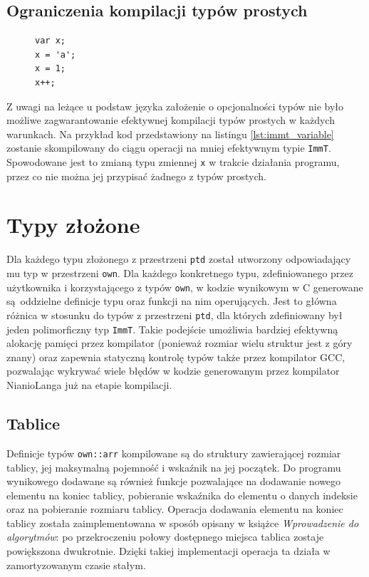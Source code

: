 \documentclass[licencjacka]{pracamgr}
\begin{document}
\subsection{Ograniczenia kompilacji typów prostych}
\begin{figure}
\begin{lstlisting}[caption={Zmienna kompilowana do typu \texttt{ImmT}},label={lst:immt_variable},aboveskip=-15pt,language=nl]
var x;
x = 'a';
x = 1;
x++;
\end{lstlisting}
\end{figure}
Z uwagi na leżące u podstaw języka założenie o opcjonalności typów nie było możliwe
zagwarantowanie efektywnej kompilacji typów prostych w każdych warunkach.
Na przykład kod przedstawiony na listingu \ref{lst:immt_variable} zostanie skompilowany do ciągu operacji na mniej efektywnym typie
\texttt{ImmT}. Spowodowane jest to zmianą typu zmiennej \texttt{x} w trakcie działania programu,
przez co nie można jej przypisać żadnego z typów prostych.

\section{Typy złożone}
Dla każdego typu złożonego z przestrzeni \texttt{ptd} został utworzony odpowiadający mu typ
w przestrzeni \texttt{own}. Dla każdego konkretnego typu, zdefiniowanego przez użytkownika
i korzystającego z typów \texttt{own}, w kodzie wynikowym w C generowane są oddzielne definicje
typu oraz funkcji na nim operujących. Jest to główna różnica w stosunku do typów z przestrzeni
\texttt{ptd}, dla których zdefiniowany był jeden polimorficzny typ \texttt{ImmT}.
Takie podejście umożliwia bardziej efektywną alokację pamięci przez kompilator (ponieważ rozmiar
wielu struktur jest z góry znany) oraz zapewnia statyczną kontrolę typów także przez kompilator
GCC, pozwalając wykrywać wiele błędów w kodzie generowanym przez kompilator
NianioLanga już na etapie kompilacji.
\subsection{Tablice}
Definicje typów \texttt{own::arr} kompilowane są do struktury zawierającej rozmiar tablicy, jej
maksymalną pojemność i wskaźnik na jej początek. Do programu wynikowego
dodawane są również funkcje pozwalające na dodawanie nowego elementu na koniec tablicy, pobieranie wskaźnika do elementu
o danych indeksie oraz na pobieranie rozmiaru tablicy. Operacja dodawania elementu na koniec tablicy
została zaimplementowana w sposób opisany w książce
\textit{Wprowadzenie do algorytmów}\cite{cormen}: po przekroczeniu połowy dostępnego miejsca
tablica zostaje powiększona dwukrotnie. Dzięki takiej implementacji operacja
ta działa w zamortyzowanym czasie stałym.
\end{document}
